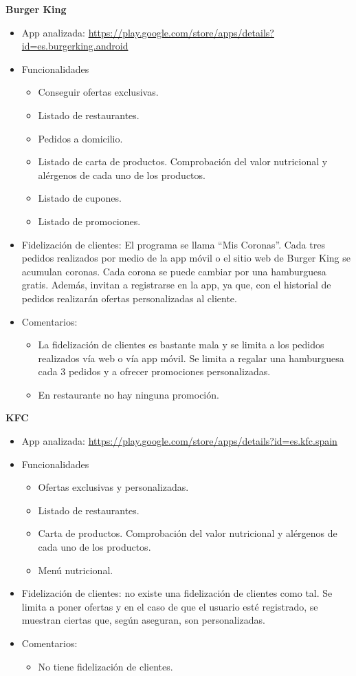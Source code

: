 \documentclass[twoside]{report}
\begin{document}
\textbf{Burger King}\\
\begin{itemize}
\item App analizada: \url{https://play.google.com/store/apps/details?id=es.burgerking.android}
\item Funcionalidades
	\begin{itemize}
	\item Conseguir ofertas exclusivas.
	\item Listado de restaurantes.
	\item Pedidos a domicilio.
	\item Listado de carta de productos. Comprobación del valor nutricional y alérgenos de cada uno de los productos. 
	\item Listado de cupones.
	\item Listado de promociones.
	\end{itemize}
\item Fidelización de clientes: El programa se llama “Mis Coronas”. Cada tres pedidos realizados por medio de la app móvil o el sitio web de Burger King se acumulan coronas. Cada corona se puede cambiar por una hamburguesa gratis. Además, invitan a registrarse en la app, ya que, con el historial de pedidos realizarán ofertas personalizadas al cliente.
\item Comentarios: 
	\begin{itemize}
	\item La fidelización de clientes es bastante mala y se limita a los pedidos realizados vía web o vía app móvil. Se limita a regalar una hamburguesa cada 3 pedidos y a ofrecer promociones personalizadas. 
	\item En restaurante no hay ninguna promoción.
	\end{itemize}
\end{itemize}

\textbf{KFC}\\
\begin{itemize}
\item App analizada: \url{https://play.google.com/store/apps/details?id=es.kfc.spain}
\item Funcionalidades
	\begin{itemize}
	\item Ofertas exclusivas y personalizadas.
	\item Listado de restaurantes.
	\item Carta de productos. Comprobación del valor nutricional y alérgenos de cada uno de los productos.
	\item Menú nutricional.
	\end{itemize}
\item Fidelización de clientes: no existe una fidelización de clientes como tal. Se limita a poner ofertas y en el caso de que el usuario esté registrado, se muestran ciertas que, según aseguran, son personalizadas.
\item Comentarios: 
	\begin{itemize}
	\item No tiene fidelización de clientes.
	\end{itemize}
\end{itemize}
\end{document}
